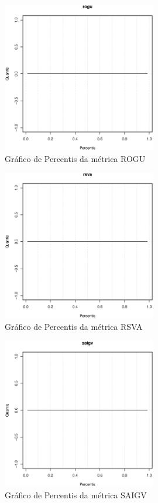 \begin{anexosenv}
\begin{figure}[h]
  \centering
  \includegraphics[width=0.6\textwidth]
      {dados/linux/rogu.eps}
  \caption{Gráfico de Percentis da métrica ROGU}
\end{figure}

\newpage

\begin{figure}[h]
  \centering
  \includegraphics[width=0.6\textwidth]
      {dados/linux/rsva.eps}
  \caption{Gráfico de Percentis da métrica RSVA}
\end{figure}

\begin{figure}[h]
  \centering
  \includegraphics[width=0.6\textwidth]
      {dados/linux/saigv.eps}
  \caption{Gráfico de Percentis da métrica SAIGV}
\end{figure}


\end{anexosenv}
